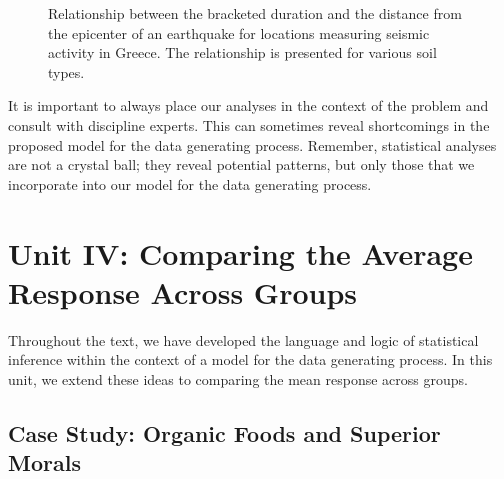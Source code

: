 \documentclass[
  letterpaper,
  DIV=11,
  numbers=noendperiod]{scrreprt}
\theoremstyle{definition}
\theoremstyle{definition}
\theoremstyle{plain}
\theoremstyle{remark}
\begin{document}
\begin{figure}


\caption{\label{fig-regrecap-multivariable}Relationship between the
bracketed duration and the distance from the epicenter of an earthquake
for locations measuring seismic activity in Greece. The relationship is
presented for various soil types.}

\end{figure}%

It is important to always place our analyses in the context of the
problem and consult with discipline experts. This can sometimes reveal
shortcomings in the proposed model for the data generating process.
Remember, statistical analyses are not a crystal ball; they reveal
potential patterns, but only those that we incorporate into our model
for the data generating process.

\part{Unit IV: Comparing the Average Response Across Groups}

Throughout the text, we have developed the language and logic of
statistical inference within the context of a model for the data
generating process. In this unit, we extend these ideas to comparing the
mean response across groups.

\chapter{Case Study: Organic Foods and Superior
Morals}\label{sec-caseorganic}
\end{document}
